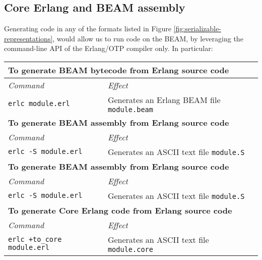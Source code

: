\subsection{Core Erlang and BEAM assembly}

Generating code in any of the formats listed in Figure
\ref{fig:serializable-representations}, would allow us to run code on
the BEAM, by leveraging the command-line API of the Erlang/OTP
compiler only. In particular:

\begin{table}[h]

\centering

\renewcommand*{\arraystretch}{1.5}

\begin{tabular}{|l|l|}
\hline%
\multicolumn{2}{|l|}{%
  \textbf{To generate BEAM bytecode from Erlang source code}%
}\\\hline%
\emph{Command} & \emph{Effect} \\\hline
  \lstinline[]!erlc module.erl! &%
  Generates an Erlang BEAM file \texttt{module.beam}
\\\hline%
\multicolumn{2}{|l|}{%
  \textbf{To generate BEAM assembly from Erlang source code}%
}\\\hline%
\emph{Command} & \emph{Effect} \\\hline
  \lstinline[]!erlc -S module.erl! &%
  Generates an ASCII text file \texttt{module.S}
\\\hline%
\multicolumn{2}{|l|}{%
  \textbf{To generate BEAM assembly from Erlang source code}%
}\\\hline%
\emph{Command} & \emph{Effect} \\\hline
  \lstinline[]!erlc -S module.erl! &%
  Generates an ASCII text file \texttt{module.S}
\\\hline%
\multicolumn{2}{|l|}{%
  \textbf{To generate Core Erlang code from Erlang source code}%
}\\\hline%
\emph{Command} & \emph{Effect} \\\hline
  \lstinline[]!erlc +to_core module.erl! &%
  Generates an ASCII text file \texttt{module.core}
\\\hline%
\end{tabular}

\end{table}

